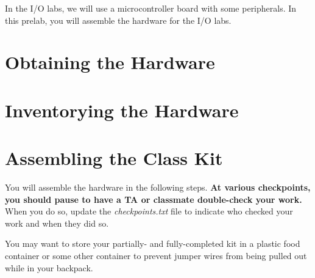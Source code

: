 




\renewcommand{\labnumber}{\ioprelabnumber}
\renewcommand{\labname}{Physical Assembly of Hardware for I/O Labs}
\renewcommand{\shortlabname}{i/o-prelab}
\renewcommand{\collaborationrules}{\ioprelabcollaboration}
\renewcommand{\duedate}{\ioprelabdue}


\pagelayout

\labidentifier

In the I/O labs, we will use a microcontroller board with some peripherals.
In this prelab, you will assemble the hardware for the I/O labs.

\section{Obtaining the Hardware} \obtaininghardware

\section{Inventorying the Hardware} \label{sec:inventory} 

\vspace{0.5cm}

\section*{Assembling the Class Kit}

    You will assemble the hardware in the following steps.
    \textbf{At various checkpoints, you should pause to have a TA or classmate double-check your work.}
    When you do so, update the \textit{checkpoints.txt} file to indicate who checked your work and when they did so.

    You may want to store your partially- and fully-completed kit in a plastic food container or some other container to prevent jumper wires from being pulled out while in your backpack.


